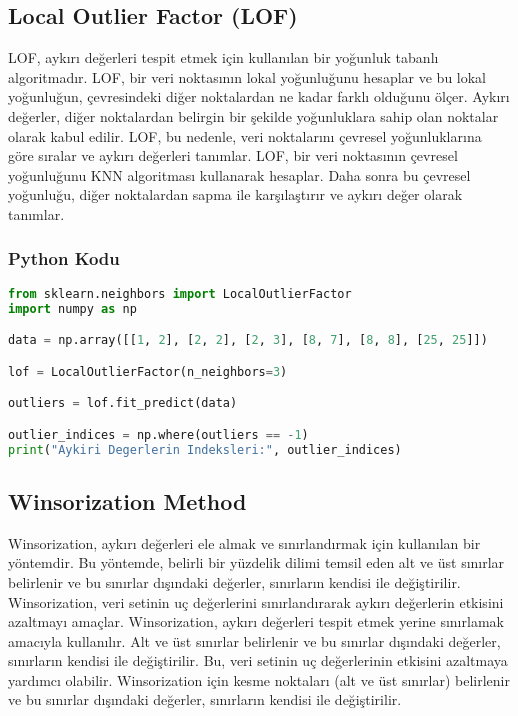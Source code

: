 \newpage

\subsection{Local Outlier Factor (LOF)}
LOF, aykırı değerleri tespit etmek için kullanılan bir yoğunluk tabanlı algoritmadır. LOF, bir veri noktasının lokal yoğunluğunu hesaplar ve bu lokal yoğunluğun, çevresindeki diğer noktalardan ne kadar farklı olduğunu ölçer. Aykırı değerler, diğer noktalardan belirgin bir şekilde yoğunluklara sahip olan noktalar olarak kabul edilir. LOF, bu nedenle, veri noktalarını çevresel yoğunluklarına göre sıralar ve aykırı değerleri tanımlar. LOF, bir veri noktasının çevresel yoğunluğunu KNN algoritması kullanarak hesaplar. Daha sonra bu çevresel yoğunluğu, diğer noktalardan sapma ile karşılaştırır ve aykırı değer olarak tanımlar.

\subsubsection{Python Kodu}

\begin{lstlisting}[language=Python]
from sklearn.neighbors import LocalOutlierFactor
import numpy as np

data = np.array([[1, 2], [2, 2], [2, 3], [8, 7], [8, 8], [25, 25]])

lof = LocalOutlierFactor(n_neighbors=3)

outliers = lof.fit_predict(data)

outlier_indices = np.where(outliers == -1)
print("Aykiri Degerlerin Indeksleri:", outlier_indices)
\end{lstlisting}

\newpage

\subsection{Winsorization Method}
Winsorization, aykırı değerleri ele almak ve sınırlandırmak için kullanılan bir yöntemdir. Bu yöntemde, belirli bir yüzdelik dilimi temsil eden alt ve üst sınırlar belirlenir ve bu sınırlar dışındaki değerler, sınırların kendisi ile değiştirilir. Winsorization, veri setinin uç değerlerini sınırlandırarak aykırı değerlerin etkisini azaltmayı amaçlar. Winsorization, aykırı değerleri tespit etmek yerine sınırlamak amacıyla kullanılır. Alt ve üst sınırlar belirlenir ve bu sınırlar dışındaki değerler, sınırların kendisi ile değiştirilir. Bu, veri setinin uç değerlerinin etkisini azaltmaya yardımcı olabilir. Winsorization için kesme noktaları (alt ve üst sınırlar) belirlenir ve bu sınırlar dışındaki değerler, sınırların kendisi ile değiştirilir.

